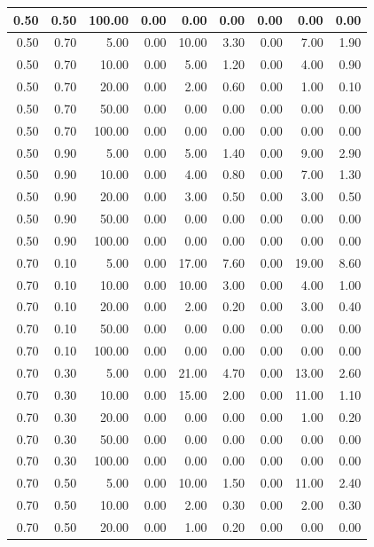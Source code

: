 \documentclass{bmstu}
\begin{document}
\begin{longtable}{|r|r|r|r|r|r|r|r|r|}
0.50 & 0.50 & 100.00 & 0.00 & 0.00 & 0.00 & 0.00 & 0.00 & 0.00 \\ \hline
0.50 & 0.70 & 5.00 & 0.00 & 10.00 & 3.30 & 0.00 & 7.00 & 1.90 \\ \hline
0.50 & 0.70 & 10.00 & 0.00 & 5.00 & 1.20 & 0.00 & 4.00 & 0.90 \\ \hline
0.50 & 0.70 & 20.00 & 0.00 & 2.00 & 0.60 & 0.00 & 1.00 & 0.10 \\ \hline
0.50 & 0.70 & 50.00 & 0.00 & 0.00 & 0.00 & 0.00 & 0.00 & 0.00 \\ \hline
0.50 & 0.70 & 100.00 & 0.00 & 0.00 & 0.00 & 0.00 & 0.00 & 0.00 \\ \hline
0.50 & 0.90 & 5.00 & 0.00 & 5.00 & 1.40 & 0.00 & 9.00 & 2.90 \\ \hline
0.50 & 0.90 & 10.00 & 0.00 & 4.00 & 0.80 & 0.00 & 7.00 & 1.30 \\ \hline
0.50 & 0.90 & 20.00 & 0.00 & 3.00 & 0.50 & 0.00 & 3.00 & 0.50 \\ \hline
0.50 & 0.90 & 50.00 & 0.00 & 0.00 & 0.00 & 0.00 & 0.00 & 0.00 \\ \hline
0.50 & 0.90 & 100.00 & 0.00 & 0.00 & 0.00 & 0.00 & 0.00 & 0.00 \\ \hline
0.70 & 0.10 & 5.00 & 0.00 & 17.00 & 7.60 & 0.00 & 19.00 & 8.60 \\ \hline
0.70 & 0.10 & 10.00 & 0.00 & 10.00 & 3.00 & 0.00 & 4.00 & 1.00 \\ \hline
0.70 & 0.10 & 20.00 & 0.00 & 2.00 & 0.20 & 0.00 & 3.00 & 0.40 \\ \hline
0.70 & 0.10 & 50.00 & 0.00 & 0.00 & 0.00 & 0.00 & 0.00 & 0.00 \\ \hline
0.70 & 0.10 & 100.00 & 0.00 & 0.00 & 0.00 & 0.00 & 0.00 & 0.00 \\ \hline
0.70 & 0.30 & 5.00 & 0.00 & 21.00 & 4.70 & 0.00 & 13.00 & 2.60 \\ \hline
0.70 & 0.30 & 10.00 & 0.00 & 15.00 & 2.00 & 0.00 & 11.00 & 1.10 \\ \hline
0.70 & 0.30 & 20.00 & 0.00 & 0.00 & 0.00 & 0.00 & 1.00 & 0.20 \\ \hline
0.70 & 0.30 & 50.00 & 0.00 & 0.00 & 0.00 & 0.00 & 0.00 & 0.00 \\ \hline
0.70 & 0.30 & 100.00 & 0.00 & 0.00 & 0.00 & 0.00 & 0.00 & 0.00 \\ \hline
0.70 & 0.50 & 5.00 & 0.00 & 10.00 & 1.50 & 0.00 & 11.00 & 2.40 \\ \hline
0.70 & 0.50 & 10.00 & 0.00 & 2.00 & 0.30 & 0.00 & 2.00 & 0.30 \\ \hline
0.70 & 0.50 & 20.00 & 0.00 & 1.00 & 0.20 & 0.00 & 0.00 & 0.00 \\ \hline

\end{longtable}
\end{document}
